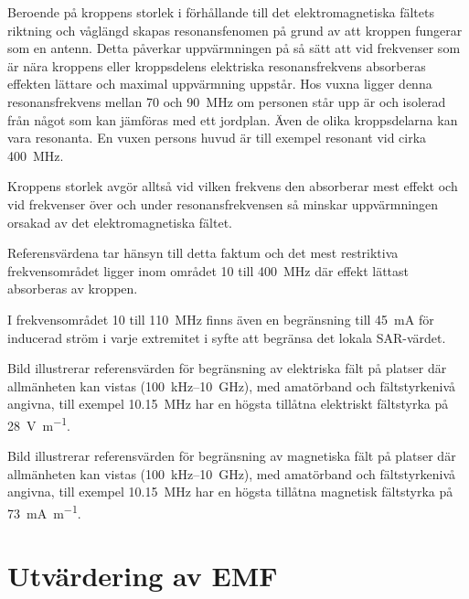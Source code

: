 Beroende på kroppens storlek i förhållande till det elektromagnetiska fältets
riktning och våglängd skapas resonansfenomen på grund av att kroppen fungerar
som en antenn.
Detta påverkar uppvärmningen på så sätt att vid frekvenser som är nära kroppens
eller kroppsdelens elektriska resonansfrekvens absorberas effekten lättare och
maximal uppvärmning uppstår.
Hos vuxna ligger denna resonansfrekvens mellan 70 och \qty{90}{\mega\hertz} om
personen står upp är och isolerad från något som kan jämföras med ett jordplan.
Även de olika kroppsdelarna kan vara resonanta.
En vuxen persons huvud är till exempel resonant vid cirka \qty{400}{\mega\hertz}.

Kroppens storlek avgör alltså vid vilken frekvens den absorberar mest effekt och
vid frekvenser över och under resonansfrekvensen så minskar uppvärmningen
orsakad av det elektromagnetiska fältet.

Referensvärdena tar hänsyn till detta faktum och det mest restriktiva
frekvensområdet ligger inom området 10 till \qty{400}{\mega\hertz} där effekt
lättast absorberas av kroppen.

I frekvensområdet 10 till \qty{110}{\mega\hertz} finns även en begränsning till
\qty{45}{\milli\ampere} för inducerad ström i varje extremitet i syfte att
begränsa det lokala SAR-värdet.

\newpage
{}

Bild  illustrerar referensvärden för begränsning av elektriska
fält på platser där allmänheten kan vistas (100~kHz--10~GHz), med amatörband
och fältstyrkenivå angivna, till exempel \qty{10,15}{\mega\hertz} har en högsta
tillåtna elektriskt fältstyrka på \qty{28}{\volt\per\metre}.

\newpage
Bild  illustrerar referensvärden för begränsning av magnetiska
fält på platser där allmänheten kan vistas (100~kHz--10~GHz), med amatörband
och fältstyrkenivå angivna, till exempel \qty{10,15}{\mega\hertz} har en högsta
tillåtna magnetisk fältstyrka på \qty{73}{\milli\ampere\per\metre}.

\clearpage
\section{Utvärdering av EMF}

